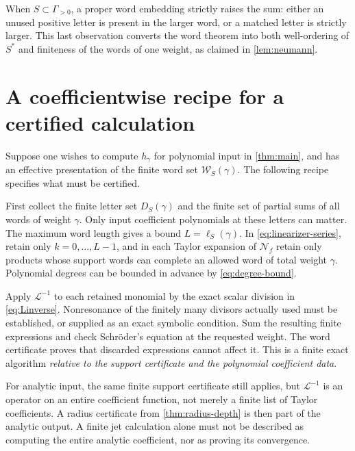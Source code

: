 \documentclass[11pt,letterpaper]{article}
\theoremstyle{definition}
\theoremstyle{remark}
\newcommand{\Li}{\mathcal L}
\newcommand{\NN}{\mathcal N}
\newcommand{\word}{\mathcal W}
\numberwithin{equation}{section}
\begin{document}
When $S\subset\Gamma_{>0}$, a proper word embedding strictly raises the
sum: either an unused positive letter is present in the larger word, or a
matched letter is strictly larger. This last observation converts the
word theorem into both well-ordering of $S^*$ and finiteness of the words of
one weight, as claimed in \cref{lem:neumann}.

\section{A coefficientwise recipe for a certified calculation}
\label{app:recipe}
Suppose one wishes to compute $h_\gamma$ for polynomial input in
\cref{thm:main}, and has an effective presentation of the finite word set
$\word_S(\gamma)$. The following recipe specifies what must be certified.

First collect the finite letter set $D_S(\gamma)$ and the finite set of
partial sums of all words of weight $\gamma$. Only input coefficient
polynomials at these letters can matter. The maximum word length gives a
bound $L=\ell_S(\gamma)$. In \eqref{eq:linearizer-series}, retain only
$k=0,\ldots,L-1$, and in each Taylor expansion of $\NN_f$ retain only
products whose support words can complete an allowed word of total weight
$\gamma$. Polynomial degrees can be bounded in advance by
\eqref{eq:degree-bound}.

Apply $\Li^{-1}$ to each retained monomial by the exact scalar division in
\eqref{eq:Linverse}. Nonresonance of the finitely many divisors actually
used must be established, or supplied as an exact symbolic condition. Sum
the resulting finite expressions and check Schr\"oder's equation at the
requested weight. The word certificate proves that discarded expressions
cannot affect it. This is a finite exact algorithm \emph{relative to the
support certificate and the polynomial coefficient data}.

For analytic input, the same finite support certificate still applies, but
$\Li^{-1}$ is an operator on an entire coefficient function, not merely a
finite list of Taylor coefficients. A radius certificate from
\cref{thm:radius-depth} is then part of the analytic output. A finite jet
calculation alone must not be described as computing the entire analytic
coefficient, nor as proving its convergence.
\end{document}
